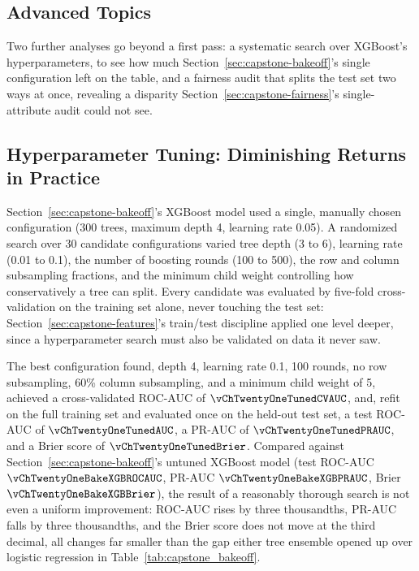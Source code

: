 \documentclass[../ai_in_finance]{subfiles}
\begin{document}
\subsection{Advanced Topics}
\label{sec:capstone-advanced}

Two further analyses go beyond a first pass: a systematic search over XGBoost's hyperparameters, to see how much Section~\ref{sec:capstone-bakeoff}'s single configuration left on the table, and a fairness audit that splits the test set two ways at once, revealing a disparity Section~\ref{sec:capstone-fairness}'s single-attribute audit could not see.

\subsection{Hyperparameter Tuning: Diminishing Returns in Practice}
\label{sec:capstone-tuning}

Section~\ref{sec:capstone-bakeoff}'s XGBoost model used a single, manually chosen configuration (300 trees, maximum depth 4, learning rate 0.05). A randomized search over 30 candidate configurations varied tree depth (3 to 6), learning rate (0.01 to 0.1), the number of boosting rounds (100 to 500), the row and column subsampling fractions, and the minimum child weight controlling how conservatively a tree can split. Every candidate was evaluated by five-fold cross-validation on the training set alone, never touching the test set: Section~\ref{sec:capstone-features}'s train/test discipline applied one level deeper, since a hyperparameter search must also be validated on data it never saw.

The best configuration found, depth 4, learning rate 0.1, 100 rounds, no row subsampling, 60\% column subsampling, and a minimum child weight of 5, achieved a cross-validated ROC-AUC of $\vChTwentyOneTunedCVAUC$, and, refit on the full training set and evaluated once on the held-out test set, a test ROC-AUC of $\vChTwentyOneTunedAUC$, a PR-AUC of $\vChTwentyOneTunedPRAUC$, and a Brier score of $\vChTwentyOneTunedBrier$. Compared against Section~\ref{sec:capstone-bakeoff}'s untuned XGBoost model (test ROC-AUC $\vChTwentyOneBakeXGBROCAUC$, PR-AUC $\vChTwentyOneBakeXGBPRAUC$, Brier $\vChTwentyOneBakeXGBBrier$), the result of a reasonably thorough search is not even a uniform improvement: ROC-AUC rises by three thousandths, PR-AUC falls by three thousandths, and the Brier score does not move at the third decimal, all changes far smaller than the gap either tree ensemble opened up over logistic regression in Table~\ref{tab:capstone_bakeoff}.
\end{document}
